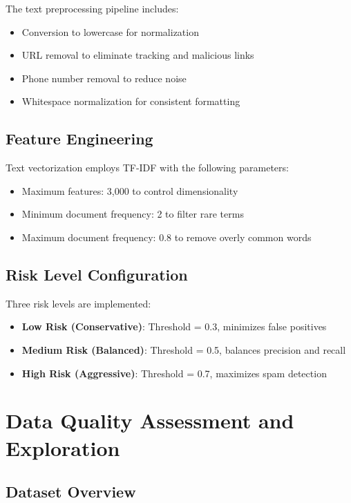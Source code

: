 \documentclass[12pt,a4paper]{article}
\begin{document}
The text preprocessing pipeline includes:

\begin{itemize}
    \item Conversion to lowercase for normalization
    \item URL removal to eliminate tracking and malicious links
    \item Phone number removal to reduce noise
    \item Whitespace normalization for consistent formatting
\end{itemize}

\subsection{Feature Engineering}

Text vectorization employs TF-IDF with the following parameters:
\begin{itemize}
    \item Maximum features: 3,000 to control dimensionality
    \item Minimum document frequency: 2 to filter rare terms
    \item Maximum document frequency: 0.8 to remove overly common words
\end{itemize}

\subsection{Risk Level Configuration}

Three risk levels are implemented:

\begin{itemize}
    \item \textbf{Low Risk (Conservative)}: Threshold = 0.3, minimizes false positives
    \item \textbf{Medium Risk (Balanced)}: Threshold = 0.5, balances precision and recall
    \item \textbf{High Risk (Aggressive)}: Threshold = 0.7, maximizes spam detection
\end{itemize}

\section{Data Quality Assessment and Exploration}

\subsection{Dataset Overview}
\end{document}
